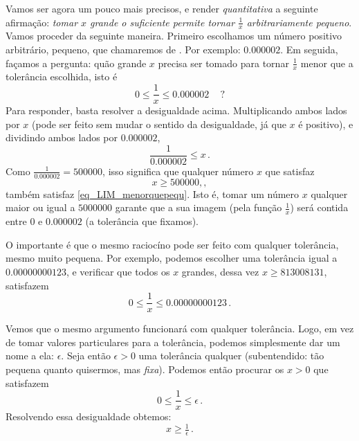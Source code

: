 \begin{ex}
Vamos ser agora um pouco mais precisos, e render \emph{quantitativa} a
seguinte afirmação:
\emph{tomar $x$ grande o suficiente permite tornar $\frac1x$ 
arbitrariamente pequeno}. 
Vamos proceder da seguinte maneira. Primeiro
escolhamos
um número positivo arbitrário, pequeno, que chamaremos de
. Por exemplo:
$0.000002$. Em seguida, façamos a pergunta:
quão grande $x$ precisa ser tomado
para tornar
$\frac{1}{x}$ menor que a tolerância escolhida, isto é
\begin{equation}\label{eq_LIM_menorquepequ} 
0\leq \frac{1}{x}\leq 0.000002\,\quad ?
\end{equation}
Para responder, basta resolver a desigualdade acima.
Multiplicando ambos lados por $x$ (pode ser feito sem
mudar o sentido da
desigualdade, já que $x$ é positivo), e dividindo ambos lados por
$0.000002$,
\[ \frac{1}{0.000002}\leq x\,.
\]
Como $\frac{1}{0.000002}=500000$, isso significa que 
qualquer número $x$ que satisfaz 
\[x\geq 500000,,
\]
também satisfaz \eqref{eq_LIM_menorquepequ}.
Isto é, tomar um número $x$ qualquer maior ou igual a $5000000$
garante que a sua
imagem (pela função $\frac1x$) será contida entre $0$ e $0.000002$ (a
tolerância que fixamos).

O importante é que o mesmo raciocíno pode ser feito com qualquer
tolerância, mesmo muito pequena. Por exemplo, podemos escolher uma
tolerância igual a
$0.00000000123$, e verificar que todos os $x$ grandes, dessa vez
$x\geq 813008131$, satisfazem
\[ 
0\leq \frac{1}{x}\leq 0.00000000123\,.
\]

Vemos que o mesmo argumento funcionará com qualquer tolerância.
Logo, em vez de tomar valores particulares
para a tolerância, podemos simplesmente dar um nome a ela: $\epsilon$. 
Seja então $\epsilon>0$ uma tolerância qualquer (subentendido: tão pequena
quanto quisermos, mas \emph{fixa}). 
Podemos então procurar os $x>0$ que satisfazem
\[0\leq \frac{1}{x}\leq \epsilon\,.\]
Resolvendo essa desigualdade obtemos: 
\[x\geq \tfrac1\epsilon\,.\]


\end{ex}
